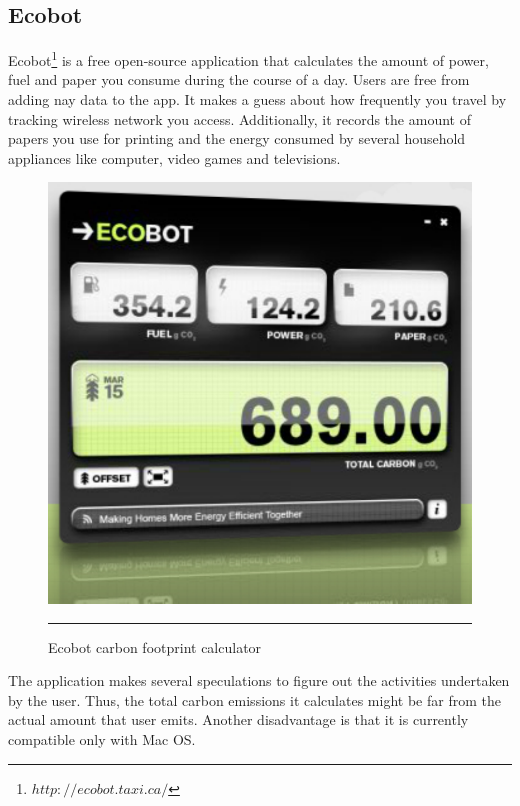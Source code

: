 \subsection{Ecobot}

Ecobot\footnote{$http://ecobot.taxi.ca/$} is a free open-source application that calculates the amount of power, fuel and paper you consume during the course of a day. Users are free from adding nay data to the app. It makes a guess about how frequently you travel by tracking wireless network you access. Additionally, it records the amount of papers you use for printing and the energy consumed by several household appliances like computer, video games and televisions.

\begin{figure}[htbp]
	\centering
		\includegraphics[scale=0.80]{./Figures/chapter2/figure21.pdf}
		\rule{35em}{0.5pt}
	\caption[Ecobot carbon footprint calculator]{Ecobot carbon footprint calculator}
	\label{fig:ecobot}
\end{figure}

The application makes several speculations to figure out the activities undertaken by the user. Thus, the total carbon emissions it calculates might be far from the actual amount that user emits. Another disadvantage is that it is currently compatible only with Mac OS.

